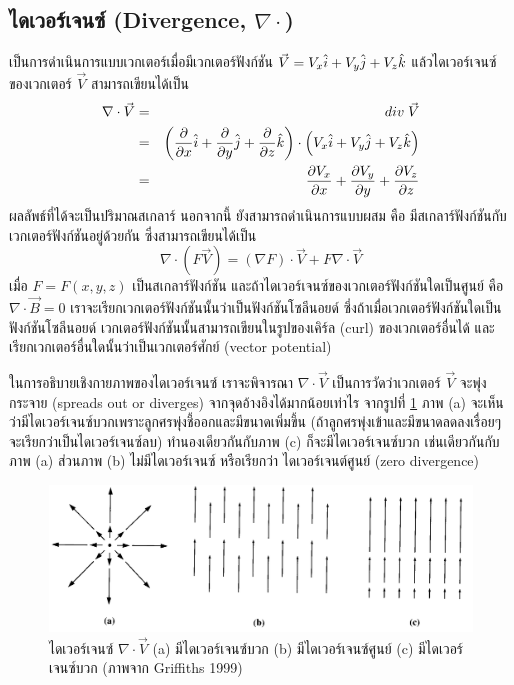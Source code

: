 \subsection{ไดเวอร์เจนซ์ (Divergence, $\nabla\cdot$)}

เป็นการดำเนินการแบบเวกเตอร์เมื่อมีเวกเตอร์ฟังก์ชัน $\vec{V} = V_x\hat{i} + V_y\hat{j} + V_z\hat{k}$ แล้วไดเวอร์เจนซ์ของเวกเตอร์ $\vec{V}$ สามารถเขียนได้เป็น
\begin{eqnarray}\label{DivV}
\nabla\cdot\vec{V} &=& div\;\vec{V} \nonumber \\
        &=& \left(\frac{\partial}{\partial x}\hat{i} + \frac{\partial}{\partial y}\hat{j} + \frac{\partial}{\partial z}\hat{k}\right)\cdot\left(V_x\hat{i} + V_y\hat{j} + V_z\hat{k}\right) \nonumber \\
        &=& \frac{\partial V_x}{\partial x} + \frac{\partial V_y}{\partial y} + \frac{\partial V_z}{\partial z}
\end{eqnarray}
ผลลัพธ์ที่ได้จะเป็นปริมาณสเกลาร์ นอกจากนี้ ยังสามารถดำเนินการแบบผสม คือ มีสเกลาร์ฟังก์ชันกับเวกเตอร์ฟังก์ชันอยู่ด้วยกัน ซึ่งสามารถเขียนได้เป็น
\begin{equation}\label{DivFV}
\nabla\cdot(F\vec{V}) = (\nabla F)\cdot\vec{V} + F\nabla\cdot\vec{V}
\end{equation}
เมื่อ $F = F(x, y, z)$ เป็นสเกลาร์ฟังก์ชัน และถ้าไดเวอร์เจนซ์ของเวกเตอร์ฟังก์ชันใดเป็นศูนย์ คือ $\nabla\cdot\vec{B} = 0$ เราจะเรียกเวกเตอร์ฟังก์ชันนั้นว่าเป็นฟังก์ชันโซลีนอยด์ ซึ่งถ้าเมื่อเวกเตอร์ฟังก์ชันใดเป็นฟังก์ชันโซลีนอยด์ เวกเตอร์ฟังก์ชันนั้นสามารถเขียนในรูปของเคิร์ล (curl) ของเวกเตอร์อื่นได้ และเรียกเวกเตอร์อื่นใดนั้นว่าเป็นเวกเตอร์ศักย์ (vector potential)

ในการอธิบายเชิงกายภาพของไดเวอร์เจนซ์ เราจะพิจารณา $\nabla\cdot\vec{V}$ เป็นการวัดว่าเวกเตอร์ $\vec{V}$ จะพุ่งกระจาย (spreads out or diverges) จากจุดอ้างอิงได้มากน้อยเท่าไร จากรูปที่ \ref{fig4} ภาพ (a) จะเห็นว่ามีไดเวอร์เจนซ์บวกเพราะลูกศรพุ่งชี้ออกและมีขนาดเพิ่มขึ้น (ถ้าลูกศรพุ่งเข้าและมีขนาดลดลงเรื่อยๆ จะเรียกว่าเป็นไดเวอร์เจนซ์ลบ) ทำนองเดียวกันกับภาพ (c) ก็จะมีไดเวอร์เจนซ์บวก เช่นเดียวกันกับภาพ (a) ส่วนภาพ (b) ไม่มีไดเวอร์เจนซ์ หรือเรียกว่า ไดเวอร์เจนต์ศูนย์ (zero divergence)

\begin{figure}%
\centering
\includegraphics[width=1.0\columnwidth]{Divergence.png}
\caption{ไดเวอร์เจนซ์ $\nabla\cdot\vec{V}$ (a) มีไดเวอร์เจนซ์บวก (b) มีไดเวอร์เจนซ์ศูนย์ (c) มีไดเวอร์เจนซ์บวก (ภาพจาก Griffiths 1999)}
\label{fig4}
\end{figure}

